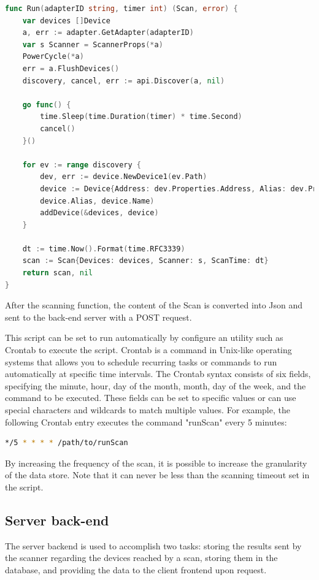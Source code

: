 \documentclass[a4paper, 11pt]{article}
\begin{document}
\begin{lstlisting}[language=Go]
func Run(adapterID string, timer int) (Scan, error) {
	var devices []Device
	a, err := adapter.GetAdapter(adapterID)
	var s Scanner = ScannerProps(*a)
	PowerCycle(*a)
	err = a.FlushDevices()
	discovery, cancel, err := api.Discover(a, nil)

	go func() {
		time.Sleep(time.Duration(timer) * time.Second)
		cancel()
	}()

	for ev := range discovery {
		dev, err := device.NewDevice1(ev.Path)
		device := Device{Address: dev.Properties.Address, Alias: dev.Properties.Alias, Name: dev.Properties.Name, RSSI: dev.Properties.RSSI, TxPower: dev.Properties.TxPower}
		device.Alias, device.Name)
		addDevice(&devices, device)
	}

	dt := time.Now().Format(time.RFC3339)
	scan := Scan{Devices: devices, Scanner: s, ScanTime: dt}
	return scan, nil
}

\end{lstlisting}

After the scanning function, the content of the Scan is converted into Json and sent to the back-end server with a POST request.

This script can be set to run automatically by configure an utility such as Crontab to execute the script. Crontab is a command in Unix-like operating systems that allows you to schedule recurring tasks or commands to run automatically at specific time intervals. The Crontab syntax consists of six fields, specifying the minute, hour, day of the month, month, day of the week, and the command to be executed. These fields can be set to specific values or can use special characters and wildcards to match multiple values. For example, the following Crontab entry executes the command "runScan" every 5 minutes:
\begin{lstlisting}[language=Bash]
*/5 * * * * /path/to/runScan
\end{lstlisting}

By increasing the frequency of the scan, it is possible to increase the granularity of the data store. Note that it can never be less than the scanning timeout set in the script.

\subsection{Server back-end}
The server backend is used to accomplish two tasks: storing the results sent by the scanner regarding the devices reached by a scan, storing them in the database, and providing the data to the client frontend upon request.
\end{document}
